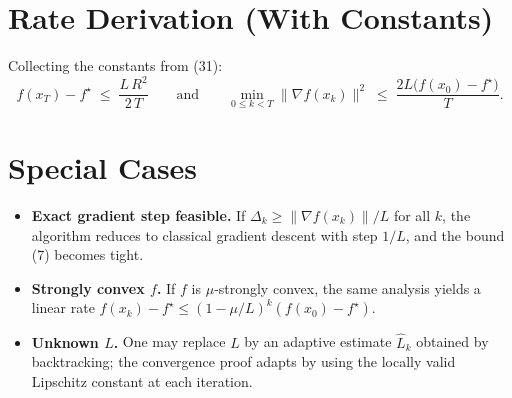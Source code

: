 \documentclass{article}
\begin{document}
\section*{Rate Derivation (With Constants)}
Collecting the constants from (31):
\[
\boxed{
f(x_T)-f^\star \;\le\; \frac{L\,R^{2}}{2\,T}
}
\qquad\text{and}\qquad
\boxed{
\min_{0\le k<T}\|\nabla f(x_k)\|^{2}\;\le\;\frac{2L\bigl(f(x_0)-f^\star\bigr)}{T}} .
\]

\section*{Special Cases}
\begin{itemize}
\item \textbf{Exact gradient step feasible.} If $\Delta_k\ge \|\nabla f(x_k)\|/L$ for all $k$, the algorithm reduces to classical gradient descent with step $1/L$, and the bound (7) becomes tight.
\item \textbf{Strongly convex $f$.} If $f$ is $\mu$‑strongly convex, the same analysis yields a linear rate $f(x_k)-f^\star\le (1-\mu/L)^{k}(f(x_0)-f^\star)$.
\item \textbf{Unknown $L$.} One may replace $L$ by an adaptive estimate $\hat L_k$ obtained by backtracking; the convergence proof adapts by using the locally valid Lipschitz constant at each iteration.
\end{itemize}
\end{document}

